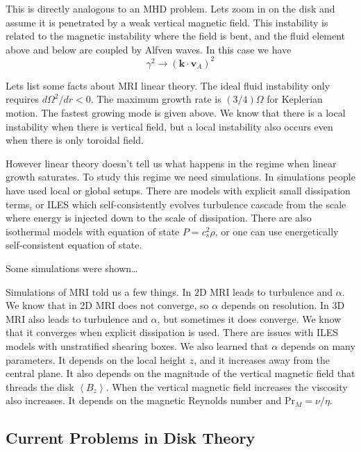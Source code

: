 \documentclass[letterpaper, 11pt]{article}
\numberwithin{equation}{section}
\numberwithin{figure}{section}
\begin{document}
This is directly analogous to an MHD problem. Lets zoom in on the disk and
assume it is penetrated by a weak vertical magnetic field. This instability is
related to the magnetic instability where the field is bent, and the fluid
element above and below are coupled by Alfven waves. In this case we have
\begin{equation}
  \label{eq:15}
  \gamma^2 \to (\mathbf{k}\cdot \mathbf{v}_A)^2
\end{equation}

Lets list some facts about MRI linear theory. The ideal fluid instability only
requires $d\Omega^2/dr < 0$. The maximum growth rate is $(3/4)\Omega$ for
Keplerian motion. The fastest growing mode is given above. We know that there is
a local instability when there is vertical field, but a local instability also
occurs even when there is only toroidal field.

However linear theory doesn't tell us what happens in the regime when linear
growth saturates. To study this regime we need simulations. In simulations
people have used local or global setups. There are models with explicit small
dissipation terms, or ILES which self-consistently evolves turbulence cascade
from the scale where energy is injected down to the scale of dissipation. There
are also isothermal models with equation of state $P = c_s^2\rho$, or one can
use energetically self-consistent equation of state.

Some simulations were shown\dots

Simulations of MRI told us a few things. In 2D MRI leads to turbulence and
$\alpha$. We know that in 2D MRI does not converge, so $\alpha$ depends on
resolution. In 3D MRI also leads to turbulence and $\alpha$, but sometimes it
does converge. We know that it converges when explicit dissipation is used.
There are issues with ILES models with unstratified shearing boxes. We also
learned that $\alpha$ depends on many parameters. It depends on the local height
$z$, and it increases away from the central plane. It also depends on the
magnitude of the vertical magnetic field that threads the disk $\left<
  B_z\right>$. When the vertical magnetic field increases the viscosity also
increases. It depends on the magnetic Reynolds number and $\mathrm{Pr}_{M} =
\nu/\eta$.

\subsection{Current Problems in Disk Theory}
\end{document}
